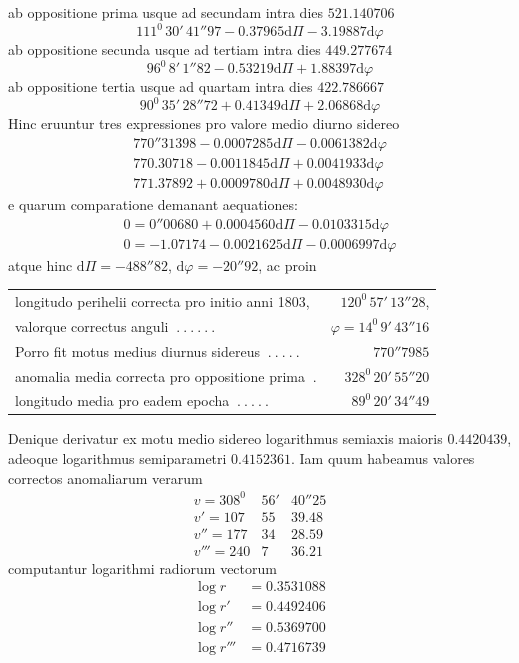 ab oppositione prima usque ad secundam intra dies $521.140706$
\[
111^0\,30'\,41''97-0.37965\mathrm d\Pi-3.19887\mathrm d\varphi
\]
ab oppositione secunda usque ad tertiam intra dies $449.277674$
\[
96^0\,8'\,1''82-0.53219\mathrm d\Pi+1.88397\mathrm d\varphi
\]
ab oppositione tertia usque ad quartam intra dies $422.786667$
\[
90^0\,35'\,28''72+0.41349\mathrm d\Pi+2.06868\mathrm d\varphi
\]
Hinc eruuntur tres expressiones pro valore medio diurno sidereo
\[
\begin{gathered}
770''31398-0.0007285\mathrm d\Pi-0.0061382\mathrm d\varphi\\
770.30718-0.0011845\mathrm d\Pi+0.0041933\mathrm d\varphi\\
771.37892+0.0009780\mathrm d\Pi+0.0048930\mathrm d\varphi
\end{gathered}
\]
e quarum comparatione demanant aequationes:
\[
\begin{gathered}
0=0''00680+0.0004560\mathrm d\Pi-0.0103315\mathrm d\varphi\\
0=-1.07174-0.0021625\mathrm d\Pi-0.0006997\mathrm d\varphi
\end{gathered}
\]
atque hinc $\mathrm d\Pi=-488''82$, $\mathrm d\varphi=-20''92$, ac proin
\begin{center}\fontsize{9}{11}\selectfont\setlength{\tabcolsep}{3pt}\begin{tabular}{lr}
longitudo perihelii correcta pro initio anni 1803,&$120^0\,57'\,13''28$,\\
valorque correctus anguli $\ .\ .\ .\ .\ .\ .$&$\varphi=14^0\,9'\,43''16$\\
Porro fit motus medius diurnus sidereus $\ .\ .\ .\ .\ .$&$770''7985$\\
anomalia media correcta pro oppositione prima $\ .$&$328^0\,20'\,55''20$\\
longitudo media pro eadem epocha $\ .\ .\ .\ .\ .$&$89^0\,20'\,34''49$
\end{tabular}\end{center}
Denique derivatur ex motu medio sidereo logarithmus semiaxis maioris $0.4420439$, adeoque logarithmus semiparametri $0.4152361$. Iam quum habeamus valores correctos anomaliarum verarum
\[
\begin{array}{rrr}
v=308^0&56'&40''25\\
v'=107&55&39.48\\
v''=177&34&28.59\\
v'''=240&7&36.21
\end{array}
\]
computantur logarithmi radiorum vectorum
\[
\begin{aligned}
\log r&=0.3531088\\
\log r'&=0.4492406\\
\log r''&=0.5369700\\
\log r'''&=0.4716739
\end{aligned}
\]
